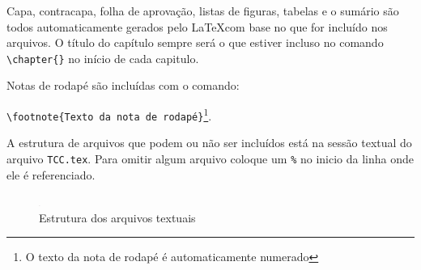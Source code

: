Capa, contracapa, folha de aprovação, listas de figuras, tabelas e o sumário são todos automaticamente gerados pelo \LaTeX   com base no que for incluído nos arquivos. O título do capítulo sempre será o que estiver incluso no comando \verb|\chapter{}| no início de cada capitulo. 

Notas de rodapé são incluídas com o comando:\par
\verb|\footnote{Texto da nota de rodapé}|\footnote{O texto da nota de rodapé é automaticamente numerado}.

A estrutura de arquivos que podem ou não ser incluídos está na sessão textual do arquivo \verb|TCC.tex|. Para omitir algum arquivo coloque um \verb|%| no inicio da linha onde ele é referenciado. 

\begin{figure}[!htb]
	\centering 
	\includegraphics[width=0.8mm]{imagens/estrutura}
	\caption{Estrutura dos arquivos textuais}
	\label{fig:estrutura}
\end{figure}